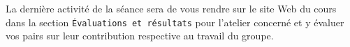\documentclass[canadien,12pt,oneside,letterpaper]{article}
\begin{document}
La dernière activité de la séance sera de vous rendre sur le site Web du cours dans la section \texttt{Évaluations et résultats} pour l'atelier concerné et y évaluer vos pairs sur leur contribution respective au travail du groupe.
 
%
%
%
%
%
%
%
\end{document}
